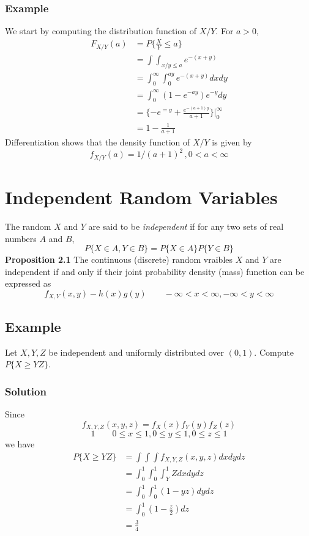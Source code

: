 \subsubsection*{Example}
We start by computing the distribution function of $X/Y$. For $a > 0$, 
\begin{equation*}
    \begin{split}
        F_{X/Y}(a) &= P\{\frac{X}{Y}\leq a\}\\
        &= \int\int_{x/y\leq a} e^{-(x + y)}\\
        &= \int^\infty_0 \int^{ay}_0 e^{-(x + y)} dx dy\\
        &= \int^\infty_0 (1 - e^{-ay})e^{-y} dy\\
        &= \{-e^{=y} + \frac{e^{-(a+1)y}}{a + 1}\}\big |^\infty_0\\
        &= 1 - \frac{1}{a + 1}
    \end{split}
\end{equation*}
Differentiation shows that the density function of $X/Y$ is given by \[f_{X/Y}(a) = 1/(a+1)^2\, , 0 < a < \infty\]
\section{Independent Random Variables}
The random $X$ and $Y$ are said to be \textit{independent} if for any two sets of real numbers $A$ and $B$, \[P\{X\in A, Y\in B\} = P\{X\in A\}P\{Y\in B\}\]
\textbf{Proposition 2.1}
The continuous (discrete) random vraibles $X$ and $Y$ are independent if and only if their joint probability density (mass) function can be expressed as \[f_{X,Y}(x,y) - h(x)g(y)\qquad -\infty < x < \infty, -\infty < y < \infty\]
\subsection*{Example}
Let $X,Y,Z$ be independent and uniformly distributed over $(0,1)$. Compute $P\{X\geq YZ\}$.
\subsubsection*{Solution}
Since \[f_{X,Y,Z}(x,y,z) = f_X(x)f_Y(y)f_Z(z)\] \[1\qquad 0\leq x\leq 1, 0\leq y\leq 1, 0\leq z\leq 1\] we have 
\begin{equation*}
    \begin{split}
        P\{X\geq YZ\} &= \int\int\int f_{X,Y,Z}(x,y,z) dx dy dz\\
        &= \int^1_0 \int^1_0 \int^1_YZ dx dy dz\\
        &= \int^1_0 \int^1_0 (1-yz) dy dz\\
        &= \int^1_0 (1- \frac{z}{2}) dz\\
        &= \boxed{\frac{3}{4}}
    \end{split}
\end{equation*}
